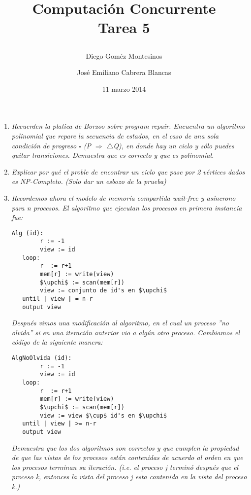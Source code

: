 \documentclass{article}
\title{ Computación Concurrente \\ \Large{Tarea 5}
\author{
  Diego Goméz Montesinos
  \and
  José Emiliano Cabrera Blancas
  }
\date{11 marzo 2014}
}
\begin{document}
\maketitle
\begin{enumerate}
  
\item{
    \textsl{
      Recuerden la platica de Borzoo sobre \textit{program
        repair}. Encuentra un algoritmo polinomial que repare la
      secuencia de estados, en el caso de una sola condición de
      progreso $\square$ (P $\Rightarrow$ $\triangle$Q), en donde hay
      un ciclo y sólo puedes quitar transiciones. Demuestra que es
      correcto y que es polinomial.
    }
  }

  \item{
      \textsl{
        Explicar por qué el proble de encontrar un ciclo que pase por
        2 vértices dados es NP-Completo. (Solo dar un esbozo de la
        prueba)
      }
    }

  \item{
      \textsl{
        Recordemos ahora el modelo de memoría compartida wait-free y
        asíncrono para n procesos. El algoritmo que ejecutan los
        procesos en primera instancia fue:
      }
      \begin{lstlisting}[frame=single,mathescape]
Alg (id):
        r := -1
        view := id
   loop:
        r  := r+1
        mem[r] := write(view)
        $\upchi$ := scan(mem[r])
        view := conjunto de id's en $\upchi$
   until | view | = n-r
   output view
      \end{lstlisting}
      \textsl{
        Después vimos una modificación al algoritmo, en el cual un
        proceso ''no olvida'' si en una iteración anterior vio a algún
        otro proceso. Cambiamos el código de la siguiente manera:
      }
\begin{lstlisting}[frame=single,mathescape]
AlgNoOlvida (id):
        r := -1
        view := id
   loop:
        r  := r+1
        mem[r] := write(view)
        $\upchi$ := scan(mem[r])
        view := view $\cup$ id's en $\upchi$
   until | view | >= n-r
   output view
      \end{lstlisting}
      \textsl{
        Demuestra que los dos algoritmos son correctos y que cumplen
        la propiedad de que las vistas de los procesos están
        contenidas de acuerdo al orden en que los procesos terminan su
        iteración. (i.e. el proceso j terminó después que el proceso
        k, entonces la vista del proceso j esta contenida en la vista
        del proceso k.)
      }
    }


\end{enumerate}
\end{document}
